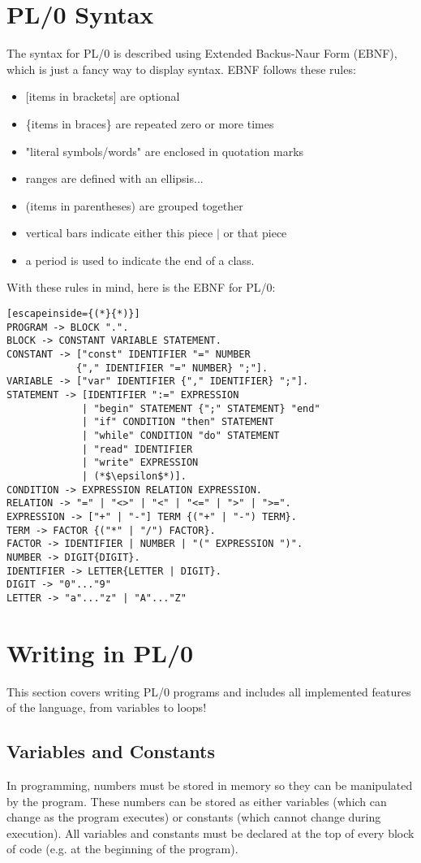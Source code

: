 \documentclass[12pt]{memoir}
\begin{document}
\section*{PL/0 Syntax}
The syntax for PL/0 is described using Extended Backus-Naur Form (EBNF), which is just
a fancy way to display syntax. EBNF follows these rules:
\begin{itemize}
    \item {[}items in brackets{]} are optional
    \item \{items in braces\} are repeated zero or more times
    \item "literal symbols/words" are enclosed in quotation marks
    \item ranges are defined with an ellipsis...
    \item (items in parentheses) are grouped together
    \item vertical bars indicate either this piece $|$ or that piece
    \item a period is used to indicate the end of a class.
\end{itemize}
With these rules in mind, here is the EBNF for PL/0:
\begin{lstlisting}[escapeinside={(*}{*)}]
PROGRAM -> BLOCK ".".
BLOCK -> CONSTANT VARIABLE STATEMENT.
CONSTANT -> ["const" IDENTIFIER "=" NUMBER
            {"," IDENTIFIER "=" NUMBER} ";"].
VARIABLE -> ["var" IDENTIFIER {"," IDENTIFIER} ";"].
STATEMENT -> [IDENTIFIER ":=" EXPRESSION
             | "begin" STATEMENT {";" STATEMENT} "end"
             | "if" CONDITION "then" STATEMENT
             | "while" CONDITION "do" STATEMENT
             | "read" IDENTIFIER
             | "write" EXPRESSION
             | (*$\epsilon$*)].
CONDITION -> EXPRESSION RELATION EXPRESSION.
RELATION -> "=" | "<>" | "<" | "<=" | ">" | ">=".
EXPRESSION -> ["+" | "-"] TERM {("+" | "-") TERM}.
TERM -> FACTOR {("*" | "/") FACTOR}.
FACTOR -> IDENTIFIER | NUMBER | "(" EXPRESSION ")".
NUMBER -> DIGIT{DIGIT}.
IDENTIFIER -> LETTER{LETTER | DIGIT}.
DIGIT -> "0"..."9"
LETTER -> "a"..."z" | "A"..."Z"
\end{lstlisting}

\pagebreak

\section*{Writing in PL/0}
This section covers writing PL/0 programs and includes all implemented features of
the language, from variables to loops!

\subsection*{Variables and Constants}
In programming, numbers must be stored in memory so they can be manipulated by the program.
These numbers can be stored as either variables (which can change as the program executes)
or constants (which cannot change during execution). All variables and constants must be
declared at the top of every block of code (e.g. at the beginning of the program).
\end{document}
